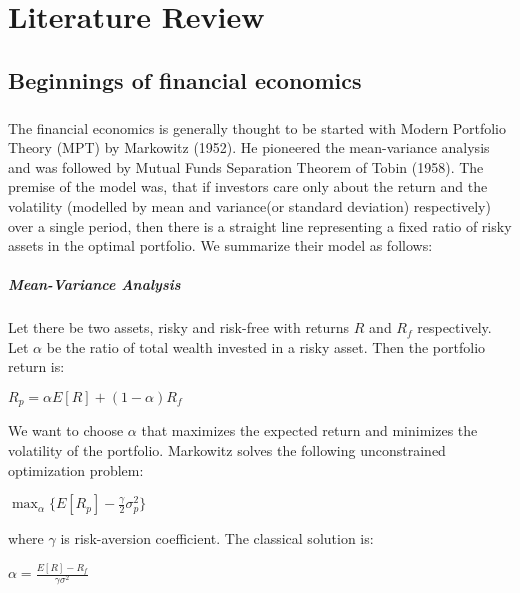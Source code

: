 \chapter{Literature Review}
\label{litreview}

\section{Beginnings of financial economics}

\paragraph*{}The financial economics is generally thought to be started with Modern Portfolio Theory (MPT) by Markowitz (1952). He pioneered the mean-variance analysis and was followed by Mutual Funds Separation Theorem of Tobin (1958). The premise of the model was, that if investors care only about the return and the volatility (modelled by mean and variance(or standard deviation) respectively) over a single period, then there is a straight line representing a fixed ratio of risky assets in the optimal portfolio. We summarize their model as follows:

\paragraph*{Mean-Variance Analysis}
Let there be two assets, risky and risk-free with returns $R$ and $R_f$ respectively. Let $\alpha$ be the ratio of total wealth invested in a risky asset. Then the portfolio return is:

\begin{center}
  $R_p = \alpha E[R] + (1-\alpha) R_f$
\end{center}

We want to choose $\alpha$ that maximizes the expected return and minimizes the volatility of the portfolio. Markowitz solves the following unconstrained optimization problem:

\begin{center}
  $\displaystyle\max_{\alpha} \{ E[R_p] - \frac{\gamma}{2}\sigma^2_p \}$
\end{center}

where $\gamma$ is risk-aversion coefficient. The classical solution is:

\begin{center}
	$\alpha = \frac{E[R] - R_f}{\gamma\sigma^2}$
\end{center}

